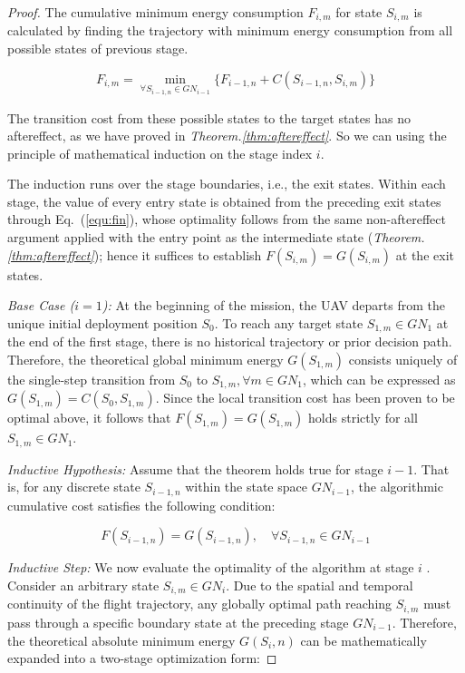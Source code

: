 \begin{proof}
    The cumulative minimum energy consumption $F_{i,m}$ for state $S_{i,m}$ is calculated by finding the trajectory with minimum energy consumption from all possible states of previous stage.

$$F_{i,m} = \min_{\forall S_{i-1,n} \in GN_{i-1}} \{F_{i-1,n} + C(S_{i-1,n},S_{i,m})\}$$

The transition cost from these possible states to the target states has no aftereffect, as we have proved in \textit{Theorem.\ref{thm:aftereffect}}.
So we can using the principle of mathematical induction on the stage index $i$.

The induction runs over the stage boundaries, i.e., the exit states.
Within each stage, the value of every entry state is obtained from the preceding exit states through Eq.~(\ref{equ:fin}), whose optimality follows from the same non-aftereffect argument applied with the entry point as the intermediate state (\textit{Theorem.\ref{thm:aftereffect}}); hence it suffices to establish $F(S_{i,m}) = G(S_{i,m})$ at the exit states.

\textit{Base Case ($i = 1$):} At the beginning of the mission, the UAV departs from the unique initial deployment position $S_0$.
To reach any target state $S_{1,m} \in GN_1$ at the end of the first stage, there is no historical trajectory or prior decision path.
Therefore, the theoretical global minimum energy $G(S_{1,m})$ consists uniquely of the single-step transition from $S_0$ to $S_{1,m}, \forall m\in GN_1 $, which can be expressed as $G(S_{1,m}) = C(S_0, S_{1,m})$.
Since the local transition cost has been proven to be optimal above, it follows that $F(S_{1,m}) = G(S_{1,m})$ holds strictly for all $S_{1,m} \in GN_1$.

\textit{Inductive Hypothesis:} Assume that the theorem holds true for stage $i-1$.
That is, for any discrete state $S_{i-1,n}$ within the state space $GN_{i-1}$, the algorithmic cumulative cost satisfies the following condition:

$$F(S_{i-1,n}) = G(S_{i-1,n}), \quad \forall S_{i-1,n} \in GN_{i-1}$$

\textit{Inductive Step:} We now evaluate the optimality of the algorithm at stage $i$ .
Consider an arbitrary state $S_{i,m} \in GN_i$.
Due to the spatial and temporal continuity of the flight trajectory, any globally optimal path reaching $S_{i,m}$ must pass through a specific boundary state at the preceding stage $GN_{i-1}$.
Therefore, the theoretical absolute minimum energy $G(S_i,n)$ can be mathematically expanded into a two-stage optimization form:


\end{proof}
